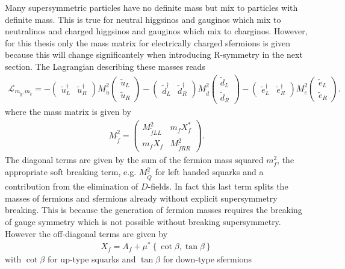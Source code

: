 Many supersymmetric particles have no definite mass but mix to particles with definite mass. This is true for neutral higgsinos and gauginos which mix to neutralinos and charged higgsinos and gauginos which mix to charginos. However, for this thesis only the mass matrix for electrically charged sfermions is given because this will change significantely when introducing R-symmetry in the next section. The Lagrangian describing these masses reads
\begin{align}
\mathcal{L}_{m_{\tilde{q}},m_{\tilde{e}}} = - \begin{pmatrix}
\tilde{u}^\dagger_L & \tilde{u}^\dagger_R 
\end{pmatrix} M^2_{\tilde{u}} \begin{pmatrix}
\tilde{u}_L \\
\tilde{u}_R 
\end{pmatrix} - \begin{pmatrix}
\tilde{d}^\dagger_L & \tilde{d}^\dagger_R 
\end{pmatrix} M^2_{\tilde{d}} \begin{pmatrix}
\tilde{d}_L \\
\tilde{d}_R 
\end{pmatrix} - \begin{pmatrix}
\tilde{e}^\dagger_L & \tilde{e}^\dagger_R 
\end{pmatrix} M^2_{\tilde{e}} \begin{pmatrix}
\tilde{e}_L \\
\tilde{e}_R 
\end{pmatrix}.
\end{align}
where the mass matrix is given by 
\begin{align}
M^2_{\tilde{f}} = \begin{pmatrix}
M^2_{\tilde{f}LL} & m_f X_f^\ast \\
m_f X_f &  M^2_{\tilde{f}RR}
\end{pmatrix}.
\end{align}
The diagonal terms are given by the sum of the fermion mass squared $m_f^2$, the appropriate soft breaking term, e.g. $M_{\tilde{Q}}^2$ for left handed squarks and a contribution from the elimination of $D$-fields. In fact this last term splits the masses of fermions and sfermions already without explicit supersymmetry breaking. This is because the generation of fermion masses requires the breaking of gauge symmetry which is not possible without breaking supersymmetry. However the off-diagonal terms are given by
\begin{align}
X_f = A_f + \mu^\ast\left\{ \cot \beta, \tan \beta \right\} \label{eq:off_diagonal}
\end{align}
with $\cot \beta$ for up-type squarks and $\tan \beta$ for down-type sfermions

